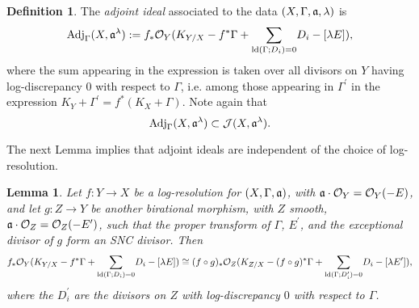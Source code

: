 \documentclass[11pt]{amsart}
\theoremstyle{plain}
\newtheorem{lemma}[theorem]{Lemma}
\theoremstyle{definition}
\newtheorem{definition}[theorem]{Definition}
\newcommand{\OO}{\mathcal  {O}}
\newcommand{\JJ}{\mathcal  {J}}
\newcommand{\fra}{\frak{a}}
\newcommand{\Adj}{{\rm Adj}}
\begin{document}
\begin{definition}
The \emph{adjoint ideal} associated to the data $(X, \Gamma, \fra, \lambda)$ is 
$$\Adj_{\Gamma} ( X, \fra^{\lambda}) : = f_* \OO_{Y} (K_{Y / X} - f^*\Gamma 
+ \underset{{\rm ld}(\Gamma; D_i)=0}{\sum} D_i - [\lambda E]),$$
where the sum appearing in the expression is taken over all divisors on $Y$ having log-discrepancy 
$0$ with respect to $\Gamma$, i.e. among those appearing in $\Gamma^{\prime}$ in the expression $K_Y + \Gamma ^{\prime}  = f^* (K_X + \Gamma)$. Note again that
$$\Adj_{\Gamma} ( X, \fra^{\lambda})\subset \JJ(X, \fra^{\lambda}).$$
\end{definition}
The next Lemma implies that adjoint ideals are independent of the choice of log-resolution.

\begin{lemma}\label{independence}
Let $f:Y \rightarrow X$ be a log-resolution for $(X, \Gamma, \fra)$, with $\fra \cdot \OO_{Y} = \OO_{Y} (-E)$, and let $g: Z\rightarrow Y$ be another birational morphism, with $Z$ smooth, $\fra \cdot \OO_{Z} = \OO_{Z} (-E^{\prime})$, such that the proper transform of $\Gamma$, $E^{\prime}$, and the exceptional divisor of $g$ form an SNC divisor. Then 
$$f_* \OO_{Y} (K_{Y / X} - f^*\Gamma 
+ \underset{{\rm ld}(\Gamma; D_i)=0}{\sum} D_i - [\lambda E]) \cong (f\circ g)_* \OO_Z(K_{Z / X} - (f\circ g)^*\Gamma 
+ \underset{{\rm ld}(\Gamma; D_i^{\prime})=0}{\sum} D_i - [\lambda E^{\prime}]),$$
where the $D_i^{\prime}$ are the divisors on $Z$ with log-discrepancy $0$ with respect to $\Gamma$.
\end{lemma}
\end{document}
